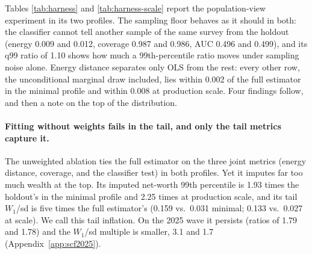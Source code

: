 
Tables \ref{tab:harness} and \ref{tab:harness-scale} report the
population-view experiment in its two profiles. The sampling floor behaves
as it should in both: the classifier cannot tell another sample of the same
survey from the holdout (energy 0.009 and 0.012, coverage 0.987 and 0.986,
AUC 0.496 and 0.499), and its q99 ratio of 1.10 shows how much a
99th-percentile ratio moves under sampling noise alone. Energy distance
separates only OLS from the rest: every other row, the unconditional
marginal draw included, lies within 0.002 of the full estimator in the
minimal profile and within 0.008 at production scale. Four findings follow,
and then a note on the top of the distribution.

\paragraph{Fitting without weights fails in the tail, and only the tail
metrics capture it.} The unweighted ablation ties the full estimator on the
three joint metrics (energy distance, coverage, and the classifier test) in
both profiles. Yet it imputes far too much wealth at the top. Its imputed
net-worth 99th percentile is 1.93 times the holdout's in the minimal profile
and 2.25 times at production scale, and its tail $W_1$/sd is five times the
full estimator's (0.159 vs.\ 0.031 minimal; 0.133 vs.\ 0.027 at scale). We
call this tail inflation. On the 2025 wave it persists (ratios of 1.79 and
1.78) and the $W_1$/sd multiple is smaller, 3.1 and 1.7
(Appendix~\ref{app:scf2025}).

